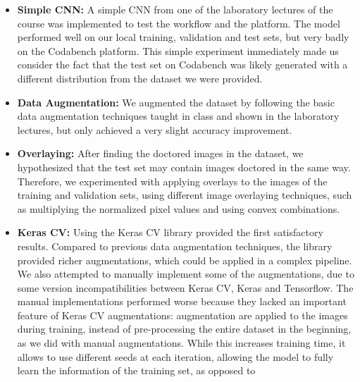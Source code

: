 \documentclass[11pt]{article}
\begin{document}
\begin{multicols}{2}
      \begin{itemize}
            \item \textbf{Simple CNN:} A simple CNN from one of the laboratory lectures
                  of the course was implemented to test the workflow and the platform.
                  The model performed well on our local training, validation and test 
                  sets, but very badly on the Codabench platform. This simple experiment 
                  immediately made us consider the fact that the test set on Codabench 
                  was likely generated with a different distribution from the dataset 
                  we were provided.
            \item \textbf{Data Augmentation:} We augmented the dataset by
                  following the basic data augmentation techniques taught in class and
                  shown in the laboratory lectures, but only achieved a very slight
                  accuracy improvement.
            \item \textbf{Overlaying:} After finding the doctored images in the
                  dataset, we hypothesized that the test set may contain images
                  doctored in the same way. Therefore, we experimented with applying
                  overlays to the images of the training and validation sets, using
                  different image overlaying techniques, such as multiplying the 
                  normalized pixel values and using convex combinations.
            \item \textbf{Keras CV:} Using the Keras CV library\cite{chollet2015keras} provided the first
                  satisfactory results. Compared to previous data augmentation techniques,
                  the library provided richer augmentations, which could be applied
                  in a complex pipeline. We also attempted to manually implement
                  some of the augmentations, due to some version incompatibilities
                  between Keras CV, Keras and Tensorflow. The manual implementations 
                  performed worse because they lacked an important feature of Keras CV
                  augmentations: augmentation are applied to the images during training, 
                  instead of pre-processing the entire dataset in the beginning, as we
                  did with manual augmentations. While this increases training time,
                  it allows to use different seeds at each iteration, allowing the model
                  to fully learn the information of the training set, as opposed to

\end{itemize}
\end{multicols}
\end{document}

